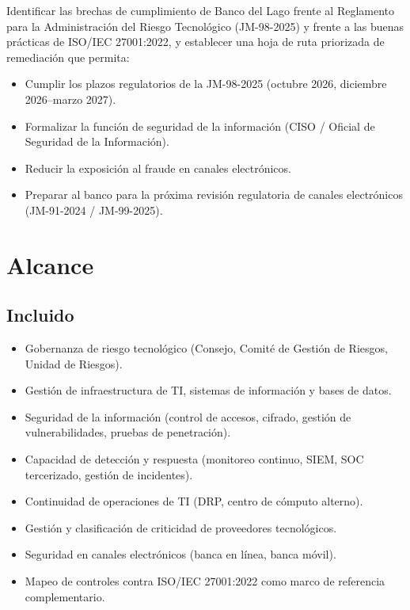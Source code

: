 \documentclass[11pt,a4paper]{article}
\begin{document}
	Identificar las brechas de cumplimiento de Banco del Lago frente al Reglamento para la Administración del Riesgo Tecnológico (JM-98-2025) y frente a las buenas prácticas de ISO/IEC 27001:2022, y establecer una hoja de ruta priorizada de remediación que permita:
	
	\begin{itemize}[leftmargin=1.5em]
		\item Cumplir los plazos regulatorios de la JM-98-2025 (octubre 2026, diciembre 2026--marzo 2027).
		\item Formalizar la función de seguridad de la información (CISO / Oficial de Seguridad de la Información).
		\item Reducir la exposición al fraude en canales electrónicos.
		\item Preparar al banco para la próxima revisión regulatoria de canales electrónicos (JM-91-2024 / JM-99-2025).
	\end{itemize}
	
	
	\section{Alcance}
	
	\subsection{Incluido}
	
	\begin{itemize}[leftmargin=1.5em]
		\item Gobernanza de riesgo tecnológico (Consejo, Comité de Gestión de Riesgos, Unidad de Riesgos).
		\item Gestión de infraestructura de TI, sistemas de información y bases de datos.
		\item Seguridad de la información (control de accesos, cifrado, gestión de vulnerabilidades, pruebas de penetración).
		\item Capacidad de detección y respuesta (monitoreo continuo, SIEM, SOC tercerizado, gestión de incidentes).
		\item Continuidad de operaciones de TI (DRP, centro de cómputo alterno).
		\item Gestión y clasificación de criticidad de proveedores tecnológicos.
		\item Seguridad en canales electrónicos (banca en línea, banca móvil).
		\item Mapeo de controles contra ISO/IEC 27001:2022 como marco de referencia complementario.
	\end{itemize}
	
\end{document}
